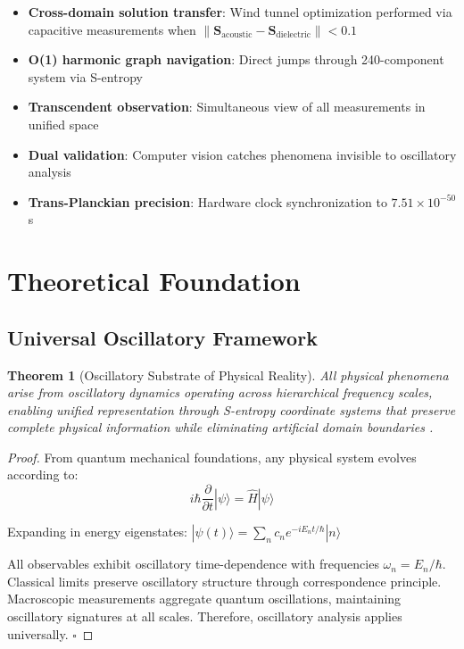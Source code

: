 \documentclass[12pt,a4paper]{article}
\newtheorem{theorem}{Theorem}
\begin{document}
\begin{itemize}
\item \textbf{Cross-domain solution transfer}: Wind tunnel optimization performed via capacitive measurements when $\|\mathbf{S}_{\text{acoustic}} - \mathbf{S}_{\text{dielectric}}\| < 0.1$
\item \textbf{O(1) harmonic graph navigation}: Direct jumps through 240-component system via S-entropy
\item \textbf{Transcendent observation}: Simultaneous view of all measurements in unified space
\item \textbf{Dual validation}: Computer vision catches phenomena invisible to oscillatory analysis
\item \textbf{Trans-Planckian precision}: Hardware clock synchronization to $7.51 \times 10^{-50}$ s
\end{itemize}

\section{Theoretical Foundation}

\subsection{Universal Oscillatory Framework}

\begin{theorem}[Oscillatory Substrate of Physical Reality]
All physical phenomena arise from oscillatory dynamics operating across hierarchical frequency scales, enabling unified representation through S-entropy coordinate systems that preserve complete physical information while eliminating artificial domain boundaries \cite{sachikonye2024physical_necessity, sachikonye2024mathematical_necessity}.
\end{theorem}

\begin{proof}
From quantum mechanical foundations, any physical system evolves according to:
\begin{equation}
i\hbar\frac{\partial}{\partial t}|\psi\rangle = \hat{H}|\psi\rangle
\end{equation}

Expanding in energy eigenstates: $|\psi(t)\rangle = \sum_n c_n e^{-iE_n t/\hbar}|n\rangle$

All observables exhibit oscillatory time-dependence with frequencies $\omega_n = E_n/\hbar$. Classical limits preserve oscillatory structure through correspondence principle. Macroscopic measurements aggregate quantum oscillations, maintaining oscillatory signatures at all scales. Therefore, oscillatory analysis applies universally. $\square$
\end{proof}
\end{document}
